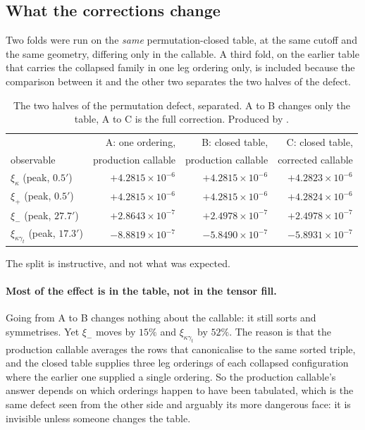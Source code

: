 \subsection{What the corrections change}

Two folds were run on the \emph{same} permutation-closed table, at the same
cutoff and the same geometry, differing only in the callable. A third fold,
on the earlier table that carries the collapsed family in one leg ordering
only, is included because the comparison between it and the other two
separates the two halves of the defect.

\begin{table}[h]
\centering
\begin{tabular}{lrrr}
\toprule
& A: one ordering, & B: closed table, & C: closed table, \\
observable & production callable & production callable & corrected callable \\
\midrule
$\xi_\kappa$ (peak, $0.5'$)          & $+4.2815\times10^{-6}$ & $+4.2815\times10^{-6}$ & $+4.2823\times10^{-6}$ \\
$\xi_+$ (peak, $0.5'$)               & $+4.2815\times10^{-6}$ & $+4.2815\times10^{-6}$ & $+4.2824\times10^{-6}$ \\
$\xi_-$ (peak, $27.7'$)              & $+2.8643\times10^{-7}$ & $+2.4978\times10^{-7}$ & $+2.4978\times10^{-7}$ \\
$\xi_{\kappa\gamma_t}$ (peak, $17.3'$) & $-8.8819\times10^{-7}$ & $-5.8490\times10^{-7}$ & $-5.8931\times10^{-7}$ \\
\bottomrule
\end{tabular}
\caption{The two halves of the permutation defect, separated. A to B
changes only the table, A to C is the full correction. Produced by
.}
\label{tab:callablefix}
\end{table}

The split is instructive, and not what was expected.

\paragraph{Most of the effect is in the table, not in the tensor fill.}
Going from A to B changes nothing about the callable: it still sorts and
symmetrises. Yet $\xi_-$ moves by $15\%$ and $\xi_{\kappa\gamma_t}$ by
$52\%$. The reason is that the production callable averages the rows that
canonicalise to the same sorted triple, and the closed table supplies three
leg orderings of each collapsed configuration where the earlier one
supplied a single ordering. So the production callable's answer depends on
which orderings happen to have been tabulated, which is the same defect
seen from the other side and arguably its more dangerous face: it is
invisible unless someone changes the table.


